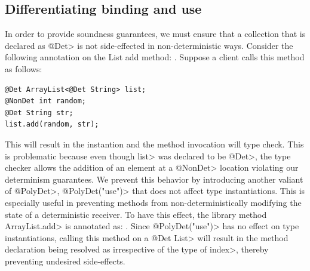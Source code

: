\subsection{Differentiating binding and use}\label{bindings-uses}

In order to provide soundness guarantees, we must ensure that a collection that is
declared as \<@Det> is not side-effected in non-deterministic ways. Consider the following annotation 
on the List add method: .
Suppose a client calls this method as follows:
\begin{verbatim}
@Det ArrayList<@Det String> list;
@NonDet int random;
@Det String str;
list.add(random, str);
\end{verbatim}
This will result in the instantion  and
the method invocation will type check. This is problematic because even though \<list> was declared to be \<@Det>,
the type checker allows the addition of an element at a \<@NonDet> location violating our determinism guarantees.
We prevent this behavior by introducing another valiant of \<@PolyDet>, \<@PolyDet("use")> that does not affect
type instantiations. This is especially useful in preventing methods from non-deterministically modifying the state
of a deterministic receiver. To have this effect, the library method \<ArrayList.add> is annotated as:
.
Since \<@PolyDet("use")> has no effect on type instantiations, calling this method on a \<@Det List>
will result in the method declaration being resolved as 
irrespective of the type of \<index>, thereby preventing undesired side-effects.

